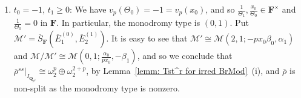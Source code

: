\documentclass[11pt]{amsart}
\theoremstyle{definition}
\numberwithin{equation}{subsection}
\theoremstyle{plain}
\theoremstyle{plain}
\theoremstyle{plain}
\theoremstyle{plain}
\theoremstyle{plain}
\theoremstyle{plain}
\theoremstyle{plain}
\theoremstyle{plain}
\theoremstyle{plain}
\theoremstyle{plain}
\theoremstyle{plain}
\theoremstyle{plain}
\theoremstyle{definition}
\theoremstyle{definition}
\theoremstyle{definition}
\theoremstyle{remark}
\renewcommand{\(}{\textup{(}}
\renewcommand{\)}{\textup{)}}
\newcommand{\Q}{\mathbf{Q}}
\newcommand{\F}{\mathbf{F}}
\newcommand{\barS}{\overline{S}}
\newcommand{\rhobar}{\overline{\rho}}
\newcommand{\cM}{\mathcal{M}}
\newcommand{\barE}{\overline{E}}
\newcommand{\IQptwo}{{I_{\Q_{p^2}}}}
\begin{document}
\begin{enumerate}[leftmargin=*]
    \begin{itemize}[leftmargin=*]
    \item if $px_0x_1\neq 4$ in $\F$, then $A$ is diagonalizable. So, extending $\F$ large enough, we have $\rhobar|_\IQptwo\cong\omega_2^{1+p}\oplus\omega_2^{1+p}$ by Lemma~\ref{lemm: Tst^r for irred BrMod}~(i).
    \item if $px_0x_1=4$ in $\F$, then $A$ is similar to $
      \begin{tiny}\begin{bmatrix}
        \frac{\lambda^2}{p} & 1\\
        0 & \frac{\lambda^2}{p}
      \end{bmatrix}\end{tiny}$
    and so $\rhobar$ is non-split with $\rhobar|_\IQptwo^{ss}\cong\omega_2^{1+p}\oplus\omega_2^{1+p}$ by Lemma~\ref{lemm: Tst^r for irred BrMod}~(i).
    \end{itemize}
  \item $t_0=-1$, $t_1\geq 0$: We have $v_p(\Theta_0)=-1=v_p(x_0)$, and so $\frac{1}{\Theta_1},\frac{x_0}{\Theta_0}\in\F^\times$ and $\frac{1}{\Theta_0}=0$ in $\F$. In particular, the monodromy type is $(0,1)$. Put $\cM'=\barS_{\F}(\barE_1^{(0)},\barE_2^{(1)})$. It is easy to see that $\cM'\cong\cM(2,1;-px_0\beta_0,\alpha_1)$ and $\cM/\cM'\cong\cM(0,1;\frac{\alpha_0}{px_0},-\beta_1)$, and so we conclude that $\rhobar^{ss}|_\IQptwo\cong\omega_2^p\oplus\omega_2^{2+p}$, by Lemma~\ref{lemm: Tst^r for irred BrMod}~(i), and $\rhobar$ is non-split as the monodromy type is nonzero.
\end{enumerate}
\end{document}
